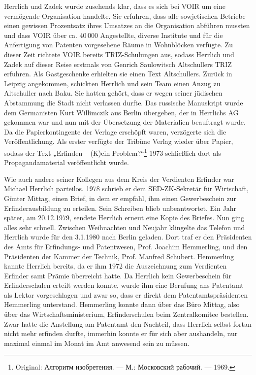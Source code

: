 \documentclass[11pt,a4paper]{article}
\begin{document}
Herrlich und Zadek wurde zusehends klar, dass es sich bei VOIR um eine
vermögende Organisation handelte. Sie erfuhren, dass alle sowjetischen
Betriebe einen gewissen Prozentsatz ihres Umsatzes an die Organisation
abführen mussten und dass VOIR über ca. 40\,000 Angestellte, diverse Institute
und für die Anfertigung von Patenten vorgesehene Räume in Wohnblöcken
verfügte. Zu dieser Zeit richtete VOIR bereits TRIZ-Schulungen aus, sodass
Herrlich und Zadek auf dieser Reise erstmals von Genrich Saulowitsch
Altschullers TRIZ erfuhren. Als Gastgeschenke erhielten sie einen Text
Altschullers. Zurück in Leipzig angekommen, schickten Herrlich und sein Team
einen Anzug zu Altschuller nach Baku. Sie hatten gehört, dass er wegen seiner
jüdischen Abstammung die Stadt nicht verlassen durfte. Das russische
Manuskript wurde dem Germanisten Kurt Willimczik aus Berlin übergeben, der in
Herrlichs AG gekommen war und nun mit der Übersetzung der Materialien
beauftragt wurde. Da die Papierkontingente der Verlage erschöpft waren,
verzögerte sich die Veröffentlichung. Als erster verfügte der Tribüne Verlag
wieder über Papier, sodass der Text „Erfinden – (K)ein
Problem?“\footnote{Original: \foreignlanguage{russian}{Алгоритм изобретения. —
    М.: Московский рабочий. — 1969.}} 1973 schließlich dort als
Propagandamaterial veröffentlicht wurde.

Wie auch andere seiner Kollegen aus dem Kreis der Verdienten Erfinder war
Michael Herrlich parteilos. 1978 schrieb er dem SED-ZK-Sekretär für
Wirtschaft, Günter Mittag, einen Brief, in dem er empfahl, ihm einen
Gewerbeschein zur Erfinderausbildung zu erteilen. Sein Schreiben blieb
unbeantwortet. Ein Jahr später, am 20.12.1979, sendete Herrlich erneut eine
Kopie des Briefes. Nun ging alles sehr schnell. Zwischen Weihnachten und
Neujahr klingelte das Telefon und Herrlich wurde für den 3.1.1980 nach Berlin
geladen. Dort traf er den Präsidenten des Amts für Erfindungs- und
Patentwesen, Prof. Joachim Hemmerling, und den Präsidenten der Kammer der
Technik, Prof. Manfred Schubert. Hemmerling kannte Herrlich bereits, da er ihm
1972 die Auszeichnung zum Verdienten Erfinder samt Prämie überreicht hatte. Da
Herrlich kein Gewerbeschein für Erfinderschulen erteilt werden konnte, wurde
ihm eine Berufung ans Patentamt als Lektor vorgeschlagen und zwar so, dass er
direkt dem Patentamtspräsidenten Hemmerling unterstand. Hemmerling konnte dann
über das Büro Mittag, also über das Wirtschaftsministerium, Erfinderschulen
beim Zentralkomitee bestellen. Zwar hatte die Anstellung am Patentamt den
Nachteil, dass Herrlich selbst fortan nicht mehr erfinden durfte, immerhin
konnte er für sich aber aushandeln, nur maximal einmal im Monat im Amt
anwesend sein zu müssen.
\end{document}
